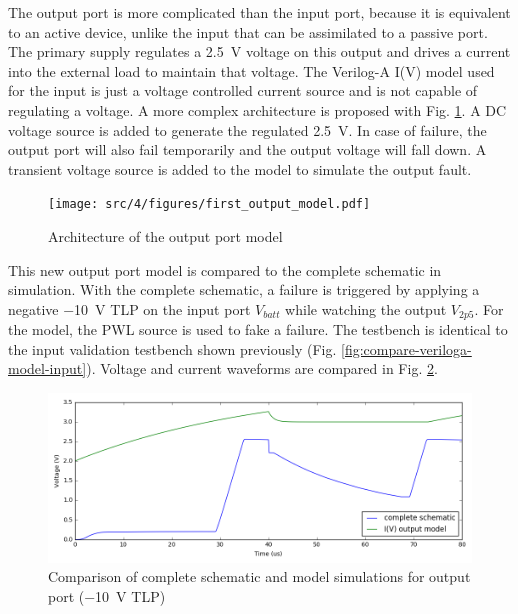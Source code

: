 The output port is more complicated than the input port, because it is equivalent to an active device, unlike the input that can be assimilated to a passive port.
The primary supply regulates a \SI{2.5}{\volt} voltage on this output and drives a current into the external load to maintain that voltage.
The Verilog-A I(V) model used for the input is just a voltage controlled current source and is not capable of regulating a voltage.
A more complex architecture is proposed with Fig. \ref{fig:first-output-model}.
A DC voltage source is added to generate the regulated \SI{2.5}{\volt}.
In case of failure, the output port will also fail temporarily and the output voltage will fall down.
A transient voltage source is added to the model to simulate the output fault.

\begin{figure}[!h]
  \centering
  \texttt{[image: src/4/figures/first\_output\_model.pdf]}
  \caption{Architecture of the output port model}
  \label{fig:first-output-model}
\end{figure}

This new output port model is compared to the complete schematic in simulation.
With the complete schematic, a failure is triggered by applying a negative \SI{-10}{\volt} TLP on the input port $V_{batt}$ while watching the output $V_{2p5}$.
For the model, the PWL source is used to fake a failure.
The testbench is identical to the input validation testbench shown previously (Fig. \ref{fig:compare-veriloga-model-input}).
Voltage and current waveforms are compared in Fig. \ref{fig:compare-model-simu-m10-output}.

\begin{figure}[!h]
  \centering
  \includegraphics[width=\textwidth]{src/4/figures/comparison_model_total_output_bad_m10V.png}
  \caption{Comparison of complete schematic and model simulations for output port (\SI{-10}{\volt} TLP)}
  \label{fig:compare-model-simu-m10-output}
\end{figure}

